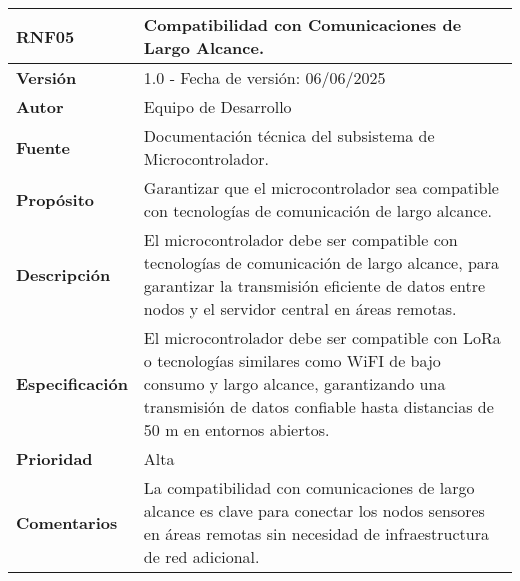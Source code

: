 \begin{longtable}{|l|p{12cm}|}
\hline
\textbf{RNF05} & \textbf{Compatibilidad con Comunicaciones de Largo Alcance.} \\
\hline
\endfirsthead
\hline
\textbf{Versión} & 1.0 - Fecha de versión: 06/06/2025 \\
\hline
\textbf{Autor} & Equipo de Desarrollo \\
\hline
\textbf{Fuente} & Documentación técnica del subsistema de Microcontrolador. \\
\hline
\textbf{Propósito} & Garantizar que el microcontrolador sea compatible con tecnologías de comunicación de largo alcance. \\
\hline
\textbf{Descripción} & El microcontrolador debe ser compatible con tecnologías de comunicación de largo alcance, para garantizar la transmisión eficiente de datos entre nodos y el servidor central en áreas remotas. \\
\hline
\textbf{Especificación} & El microcontrolador debe ser compatible con LoRa o tecnologías similares como WiFI de bajo consumo y largo alcance, garantizando una transmisión de datos confiable hasta distancias de 50 m en entornos abiertos. \\
\hline
\textbf{Prioridad} & Alta \\
\hline
\textbf{Comentarios} & La compatibilidad con comunicaciones de largo alcance es clave para conectar los nodos sensores en áreas remotas sin necesidad de infraestructura de red adicional. \\
\hline
\end{longtable}

